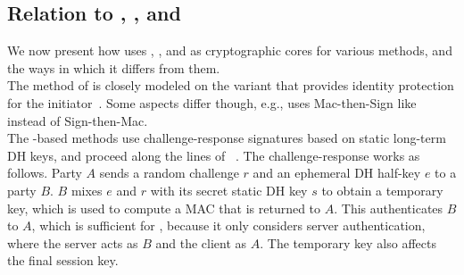\subsection{Relation to \mSigma, \mOptls{}, and \mNoise{}}
\label{sec:relationsToOtherProtocols}
We now present how \mEdhoc{} uses \mSigma, \mOptls{}, and \mNoise{} as
cryptographic cores for various methods, and the ways in which it differs from them.
\\
%
%
The \mSigSig{} method of \mEdhoc{} is closely modeled on the \mSigma{}
variant that provides identity protection for the initiator~\cite{sigma}.
%
Some aspects differ though, e.g., \mSigSig{} uses Mac-then-Sign like
\mTls{} instead of Sign-then-Mac. 
%
\\
\runhead{\mOptls{}}
The \mStat-based methods use challenge-response signatures based on static
long-term DH keys, and proceed along the lines of
\mOptls~\cite{DBLP:conf/eurosp/KrawczykW16}.
%
The challenge-response works as follows.
Party $A$ sends a random challenge $r$
and an ephemeral DH half-key $e$ to a party $B$.
%
$B$ mixes $e$ and $r$ with its secret static DH
key $s$ to obtain a temporary key, which
%
is used to compute a MAC that is returned to 
$A$.
%
This authenticates $B$ to $A$, which is sufficient for \mOptls, 
because it only considers server authentication, where the server acts as $B$
and the client as $A$.
%
The temporary key also affects the final session key.
%

